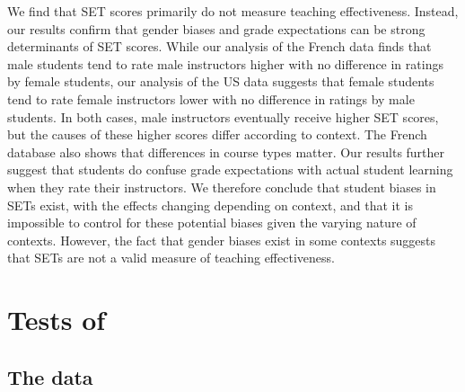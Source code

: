 \documentclass[12pt]{article}
\begin{document}
We find that SET scores primarily do not measure teaching effectiveness. Instead, our results confirm that gender biases and grade expectations can be strong determinants of SET scores. While our analysis of the French data finds that male students tend to rate male instructors higher with no difference in ratings by female students, our analysis of the US data suggests that female students tend to rate female instructors lower with no difference in ratings by male students. In both cases, male instructors eventually receive higher SET scores, but the causes of these higher scores differ according to context. The French database also shows that differences in course types matter. Our results further suggest that students do confuse grade expectations with actual student learning when they rate their instructors. We therefore conclude that student biases in SETs exist, with the effects changing depending on context, and that it is impossible to control for these potential biases given the varying nature of contexts. However, the fact that gender biases exist in some contexts suggests that SETs are not a valid measure of teaching effectiveness. 


\section{Tests of \citet{Boring2015}}

\subsection{The data}
\end{document}
